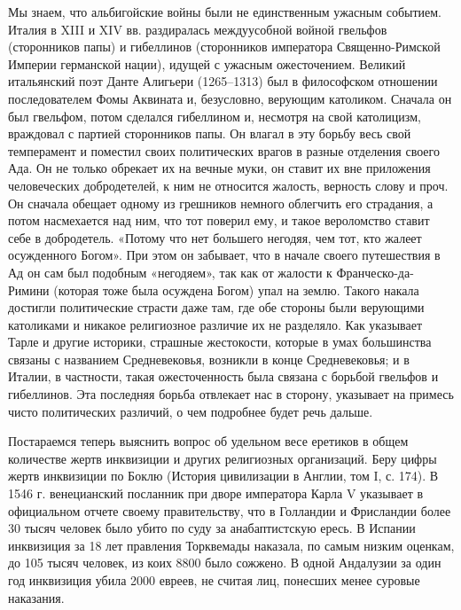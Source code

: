 Мы  знаем,  что  альбигойские   войны  были  не  единственным  ужасным
событием.  Италия в  XIII и  XIV вв.  раздиралась междуусобной  войной
гвельфов  (сторонников  папы)  и  гибеллинов  (сторонников  императора
Священно-Римской   Империи  германской   нации),   идущей  с   ужасным
ожесточением. Великий итальянский поэт Данте Алигьери (1265--1313) был
в философском  отношении последователем  Фомы Аквината  и, безусловно,
верующим католиком. Сначала он был гвельфом, потом сделался гибеллином
и, несмотря на свой католицизм,  враждовал с партией сторонников папы.
Он  влагал  в  эту  борьбу  весь свой  темперамент  и  поместил  своих
политических  врагов  в разные  отделения  своего  Ада. Он  не  только
обрекает их на  вечные муки, он ставит их  вне приложения человеческих
добродетелей, к  ним не относится  жалость, верность слову и  проч. Он
сначала обещает одному из грешников немного облегчить его страдания, а
потом насмехается  над ним, что  тот поверил ему, и  такое вероломство
ставит  себе в  добродетель.  «Потому что  нет  большего негодяя,  чем
тот,  кто жалеет  осужденного  Богом».  При этом  он  забывает, что  в
начале своего  путешествия в  Ад он сам  был подобным  «негодяем», так
как  от  жалости к  Франческо-да-Римини  (которая  тоже была  осуждена
Богом)  упал на  землю.  Такого накала  достигли политические  страсти
даже  там,  где  обе  стороны  были  верующими  католиками  и  никакое
религиозное различие  их не  разделяло. Как  указывает Тарле  и другие
историки, страшные  жестокости, которые  в умах большинства  связаны с
названием Средневековья, возникли в конце Средневековья; и в Италии, в
частности,  такая ожесточенность  была  связана с  борьбой гвельфов  и
гибеллинов. Эта последняя борьба отвлекает нас в сторону, указывает на
примесь  чисто  политических  различий,  о чем  подробнее  будет  речь
дальше.

Постараемся теперь выяснить  вопрос об удельном весе  еретиков в общем
количестве  жертв инквизиции  и других  религиозных организаций.  Беру
цифры жертв инквизиции по Боклю  (История цивилизации в Англии, том I,
с. 174). В 1546 г. венецианский посланник при дворе императора Карла V
указывает в официальном отчете своему правительству, что в Голландии и
Фрисландии более 30 тысяч человек было убито по суду за анабаптистскую
ересь. В Испании  инквизиция за 18 лет  правления Торквемады наказала,
по  самым низким  оценкам, до  105 тысяч  человек, из  коих 8800  было
сожжено. В одной  Андалузии за один год инквизиция  убила 2000 евреев,
не считая лиц, понесших менее суровые наказания.

